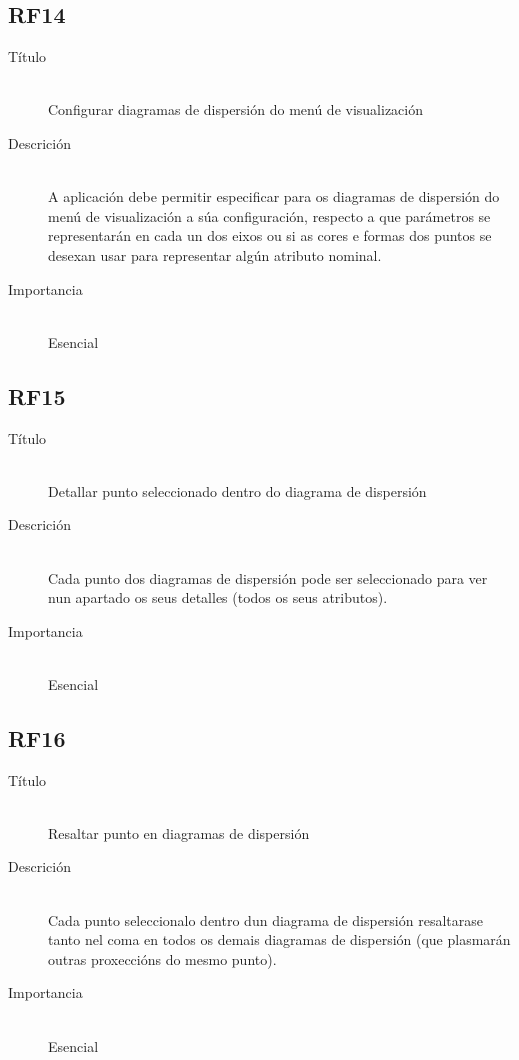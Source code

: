 \subsection*{RF14}
\begin{description}
\item[Título] \hfill \\
Configurar diagramas de dispersión do menú de visualización
\item[Descrición] \hfill \\
A aplicación debe permitir especificar para os diagramas de dispersión do menú de visualización a súa configuración, respecto a que parámetros se representarán en cada un dos eixos ou si as cores e formas dos puntos se desexan usar para representar algún atributo nominal.
\item[Importancia] \hfill \\
Esencial
\end{description}

\subsection*{RF15}
\begin{description}
\item[Título] \hfill \\
Detallar punto seleccionado dentro do diagrama de dispersión
\item[Descrición] \hfill \\
Cada punto dos diagramas de dispersión pode ser seleccionado para ver nun apartado os seus detalles (todos os seus atributos).
\item[Importancia] \hfill \\
Esencial
\end{description}

\subsection*{RF16}
\begin{description}
\item[Título] \hfill \\
Resaltar punto en diagramas de dispersión
\item[Descrición] \hfill \\
Cada punto seleccionalo dentro dun diagrama de dispersión resaltarase tanto nel coma en todos os demais diagramas de dispersión (que plasmarán outras proxeccións do mesmo punto).
\item[Importancia] \hfill \\
Esencial
\end{description}


